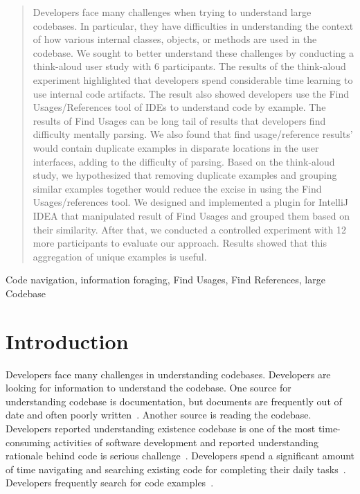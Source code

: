 \documentclass[conference]{IEEEtran}
\begin{document}
\begin{abstract}
Developers face many challenges when trying to understand large codebases. In particular, they have difficulties in understanding the context of how various internal classes, objects, or methods are used in the codebase. We sought to better understand these challenges by conducting a think-aloud user study with 6 participants. The results of the think-aloud experiment highlighted that developers spend considerable time learning to use internal code artifacts. The result also showed developers use the Find Usages/References tool of IDEs to understand code by example. The results of Find Usages can be long tail of results that developers find difficulty mentally parsing. We also found that find usage/reference results' would contain duplicate examples in disparate locations in the user interfaces, adding to the difficulty of parsing. Based on the think-aloud study, we hypothesized that removing duplicate examples and grouping similar examples together would reduce the excise in using the Find Usages/references tool. We designed and implemented a plugin for IntelliJ IDEA that manipulated result of Find Usages and grouped them based on their similarity. After that, we conducted a controlled experiment with 12 more participants to evaluate our approach. Results showed that this aggregation of unique examples is useful.
\end{abstract}

\begin{IEEEkeywords}
Code navigation, information foraging, Find Usages, Find References, large Codebase
\end{IEEEkeywords}


\section{Introduction}

Developers face many challenges in understanding codebases. Developers are looking for information to understand the codebase. One source for understanding codebase is documentation, but documents are frequently out of date and often poorly written~\cite{documentation}. Another source is reading the codebase. Developers reported understanding existence codebase is one of the most time-consuming activities of software development and reported understanding rationale behind code is serious challenge~\cite{latoza2006maintaining}. Developers spend a significant amount of time navigating and searching existing code for completing their daily tasks~\cite{piorkowski2016foraging,ko2006exploratory}. Developers frequently search for code examples~\cite{brandt2009two,sadowski2015developers}.
\end{document}
